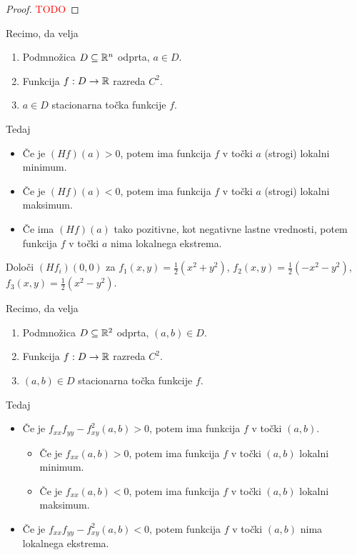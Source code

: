 \begin{proof}
    \textcolor{red}{TODO}
\end{proof}

\newpage
\begin{izrek}
    Recimo, da velja
    \begin{enumerate}
        \item Podmnožica $D \subseteq \mathbb{R}^n$ odprta, $a \in D$.
        \item Funkcija $f: D \to \mathbb{R}$ razreda $C^2$.
        \item $a \in D$ stacionarna točka funkcije $f$.
    \end{enumerate}
    Tedaj
    \begin{itemize}
        \item Če je $(Hf)(a) > 0$, potem ima funkcija $f$ v točki $a$ (strogi) lokalni minimum.
        \item Če je $(Hf)(a) < 0$, potem ima funkcija $f$ v točki $a$ (strogi) lokalni maksimum.
        \item Če ima $(Hf)(a)$ tako pozitivne, kot negativne lastne vrednosti, potem funkcija $f$ v točki $a$ nima lokalnega ekstrema.
    \end{itemize}
\end{izrek}

\begin{zgled}
    Določi $(Hf_i)(0,0)$ za $f_1(x,y) = \frac{1}{2}(x^2+y^2)$, $f_2(x,y) = \frac{1}{2}(-x^2-y^2)$, $f_3(x,y) = \frac{1}{2}(x^2-y^2)$.
\end{zgled}

\begin{posledica}[Zadostni pogoji, $n=2$]
    Recimo, da velja
    \begin{enumerate}
        \item Podmnožica $D \subseteq \mathbb{R}^2$ odprta, $(a, b) \in D$.
        \item Funkcija $f: D \to \mathbb{R}$ razreda $C^2$.
        \item $(a, b) \in D$ stacionarna točka funkcije $f$.    
    \end{enumerate}
    Tedaj
    \begin{itemize}
        \item Če je $f_{xx}f_{yy} - f_{xy}^2(a,b) > 0$, potem ima funkcija $f$ v točki $(a, b)$.
        \begin{itemize}
            \item Če je $f_{xx}(a,b)>0$, potem ima funkcija $f$ v točki $(a,b)$ lokalni minimum.
            \item Če je $f_{xx}(a,b)<0$, potem ima funkcija $f$ v točki $(a,b)$ lokalni maksimum.
        \end{itemize}
        \item Če je $f_{xx}f_{yy} - f_{xy}^2(a,b) < 0$, potem funkcija $f$ v točki $(a, b)$ nima lokalnega ekstrema.
    \end{itemize}
\end{posledica}

